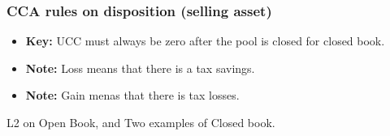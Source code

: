 \subsubsection{CCA rules on disposition (selling asset)}
\begin{definition}
    \begin{itemize}
        \item \textbf{Key:} UCC must always be zero after the pool is closed for closed book. 
        \item \textbf{Note:} Loss means that there is a tax savings. 
        \item \textbf{Note:} Gain menas that there is tax losses.
    \end{itemize}
\end{definition}

\begin{example}
    L2 on Open Book, and Two examples of Closed book.
\end{example}

